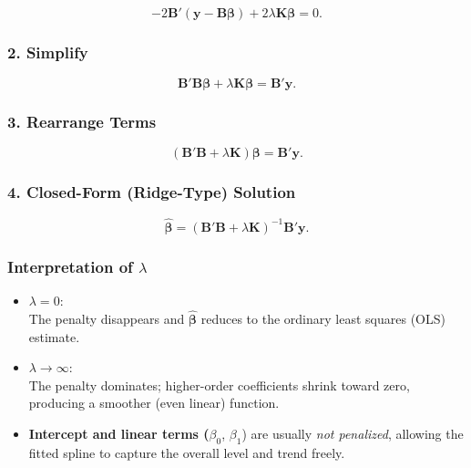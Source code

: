 \documentclass[
  letterpaper,
  DIV=11,
  numbers=noendperiod]{scrreprt}
\begin{document}
\[
-2\mathbf{B}'(\mathbf{y} - \mathbf{B}\boldsymbol{\beta}) + 2\lambda\mathbf{K}\boldsymbol{\beta} = 0.
\]

\hypertarget{simplify}{%
\subsubsection*{2. Simplify}\label{simplify}}

\[
\mathbf{B}'\mathbf{B}\boldsymbol{\beta} + \lambda\mathbf{K}\boldsymbol{\beta} = \mathbf{B}'\mathbf{y}.
\]

\hypertarget{rearrange-terms}{%
\subsubsection*{3. Rearrange Terms}\label{rearrange-terms}}

\[
(\mathbf{B}'\mathbf{B} + \lambda\mathbf{K})\boldsymbol{\beta} = \mathbf{B}'\mathbf{y}.
\]

\hypertarget{closed-form-ridge-type-solution}{%
\subsubsection*{4. Closed-Form (Ridge-Type)
Solution}\label{closed-form-ridge-type-solution}}

\[
\hat{\boldsymbol{\beta}} = (\mathbf{B}'\mathbf{B} + \lambda\mathbf{K})^{-1}\mathbf{B}'\mathbf{y}.
\]

\hypertarget{interpretation-of-lambda}{%
\subsubsection*{\texorpdfstring{Interpretation of
\(\lambda\)}{Interpretation of \textbackslash lambda}}\label{interpretation-of-lambda}}

\begin{itemize}
\item
  \(\lambda = 0\):\\
  The penalty disappears and \(\hat{\boldsymbol{\beta}}\) reduces to the
  ordinary least squares (OLS) estimate.
\item
  \(\lambda \to \infty\):\\
  The penalty dominates; higher-order coefficients shrink toward zero,
  producing a smoother (even linear) function.
\item
  \textbf{Intercept and linear terms (}\(\beta_0\), \(\beta_1\)) are
  usually \emph{not penalized}, allowing the fitted spline to capture
  the overall level and trend freely. \textbar{}
\end{itemize}
\end{document}
